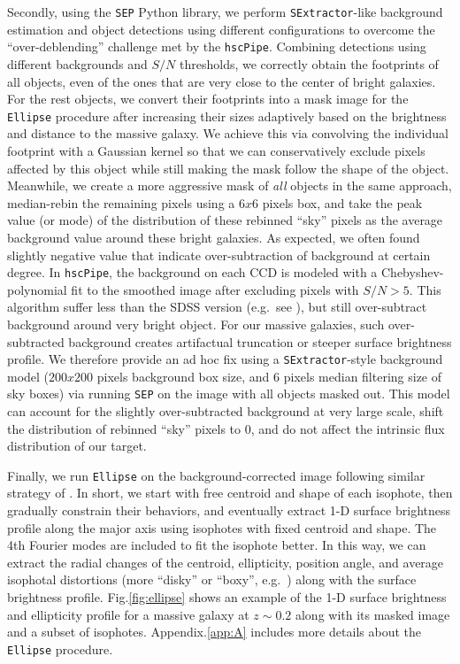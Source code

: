 \documentclass{emulateapj}
\begin{document}
\begin{CJK*}{UTF8}{gbsn}
    Secondly, using the \texttt{SEP} Python library, we perform \texttt{SExtractor}-like
    background estimation and object detections using different configurations to 
    overcome the ``over-deblending'' challenge met by the \texttt{hscPipe}. 
    Combining detections using different backgrounds and $S/N$ thresholds, 
    we correctly obtain the footprints of all objects, even of the ones that are 
    very close to the center of bright galaxies.
    For the rest objects, we convert their footprints into a mask image for the
    \texttt{Ellipse} procedure after increasing their sizes adaptively based on the 
    brightness and distance to the massive galaxy. 
    We achieve this via convolving the individual footprint with a Gaussian kernel
    so that we can conservatively exclude pixels affected by this object while still 
    making the mask follow the shape of the object. 
    Meanwhile, we create a more aggressive mask of \emph{all} objects in the same 
    approach, median-rebin the remaining pixels using a $6x6$ pixels box, and take 
    the peak value (or mode) of the distribution of these rebinned ``sky'' pixels 
    as the average background value around these bright galaxies.
    As expected, we often found slightly negative value that indicate over-subtraction 
    of background at certain degree. 
    In \texttt{hscPipe}, the background on each CCD is modeled with a 
    Chebyshev-polynomial fit to the smoothed image after excluding pixels with $S/N >5$.
    This algorithm suffer less than the SDSS version (e.g.\ see \citealt{Blanton2011}),
    but still over-subtract background around very bright object. 
    For our massive galaxies, such over-subtracted background creates artifactual
    truncation or steeper surface brightness profile.
    We therefore provide an ad hoc fix using a \texttt{SExtractor}-style background 
    model ($200x200$ pixels background box size, and 6 pixels median filtering size of 
    sky boxes) via running \texttt{SEP} on the image with all objects masked out.
    This model can account for the slightly over-subtracted background at very large 
    scale, shift the distribution of rebinned ``sky'' pixels to 0, and do not affect the 
    intrinsic flux distribution of our target. 
    
    Finally, we run \texttt{Ellipse} on the background-corrected image following similar 
    strategy of \citep{Li2012}.
    In short, we start with free centroid and shape of each isophote, then gradually 
    constrain their behaviors, and eventually extract 1-D surface brightness profile 
    along the major axis using isophotes with fixed centroid and shape.
    The 4th Fourier modes are included to fit the isophote better. 
    In this way, we can extract the radial changes of the centroid, ellipticity, 
    position angle, and average isophotal distortions (more ``disky'' or ``boxy'', 
    e.g.\ \citealt{Kormendy2009}) along with the surface brightness profile.  
    Fig.\ref{fig:ellipse} shows an example of the 1-D surface brightness and 
    ellipticity profile for a massive galaxy at $z\sim0.2$ along with its masked 
    image and a subset of isophotes.  
    Appendix.\ref{app:A} includes more details about the \texttt{Ellipse} procedure.
        

\end{CJK*}
\end{document}
